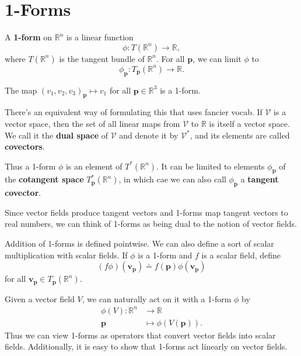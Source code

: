 \documentclass[10pt]{report}
\begin{document}
\section{1-Forms}

\begin{defn}
A \textbf{1-form} on $\mathbb{R}^n$ is a linear function
\[
	\phi:T(\mathbb{R}^n)\to \mathbb{R},
\] where $T(\mathbb{R}^n)$ is the tangent bundle of $\mathbb{R}^n$. For all $\mathbf{p}$, we can limit $\phi$ to
\[
	\phi_\mathbf{p}:T_{\mathbf{p}}(\mathbb{R}^n)\to \mathbb{R}.
\] 
\end{defn}

\begin{ex}
	The map $(v_1,v_2,v_3)_{\mathbf{p}}\mapsto v_1$ for all $\mathbf{p} \in \mathbb{R}^3$ is a 1-form.
\end{ex}

There's an equivalent way of formulating this that uses fancier vocab. If $\mathcal{V}$ is a vector space, then the set of all linear maps from $\mathcal{V}$ to $\mathbb{R}$ is itself a vector space. We call it the \textbf{dual space} of $\mathcal{V}$ and denote it by $\mathcal{V}^*$, and its elements are called \textbf{covectors}.

Thus a 1-form $\phi$ is an element of $T^*(\mathbb{R}^n)$. It can be limited to elements $\phi_\mathbf{p}$ of the \textbf{cotangent space} $T_{\mathbf{p}}^*(\mathbb{R}^n)$, in which cae we can also call $\phi_\mathbf{p}$ a \textbf{tangent covector}.

\begin{note}
Since vector fields produce tangent vectors and 1-forms map tangent vectors to real numbers, we can think of 1-forms as being dual to the notion of vector fields.
\end{note}

Addition of 1-forms is defined pointwise. We can also define a sort of scalar multiplication with scalar fields. If $\phi$ is a 1-form and $f$ is a scalar field, define
\[
	(f\phi)(\mathbf{v}_{\mathbf{p}}) \doteq f(\mathbf{p}) \phi(\mathbf{v}_\mathbf{p})
\] for all $\mathbf{v}_{\mathbf{p}} \in T_\mathbf{p}(\mathbb{R}^n)$.

Given a vector field $V$, we can naturally act on it with a 1-form $\phi$ by
\begin{align*}
	\phi(V):\mathbb{R}^n&\to \mathbb{R} \\
	\mathbf{p}&\mapsto \phi(V(\mathbf{p})).
\end{align*}
Thus we can view 1-forms as operators that convert vector fields into scalar fields. Additionally, it is easy to show that 1-forms act linearly on vector fields.
\end{document}
